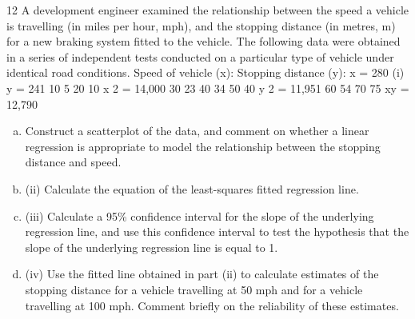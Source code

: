 \documentclass[a4paper,12pt]{article}
\begin{document}
12
A development engineer examined the relationship between the speed a vehicle is
travelling (in miles per hour, mph), and the stopping distance (in metres, m) for a new
braking system fitted to the vehicle. The following data were obtained in a series of
independent tests conducted on a particular type of vehicle under identical road
conditions.
Speed of vehicle (x):
Stopping distance (y):
x = 280
(i)
y = 241
10
5
20
10
x 2 = 14,000
30
23
40
34
50
40
y 2 = 11,951
60
54
70
75
xy = 12,790

\begin{enumerate}[(a)]
\item Construct a scatterplot of the data, and comment on whether a linear
regression is appropriate to model the relationship between the stopping
distance and speed. 
\item (ii) Calculate the equation of the least-squares fitted regression line. 
\item (iii) Calculate a 95\% confidence interval for the slope of the underlying regression
line, and use this confidence interval to test the hypothesis that the slope of the
underlying regression line is equal to 1.
\item 
(iv) Use the fitted line obtained in part (ii) to calculate estimates of the stopping
distance for a vehicle travelling at 50 mph and for a vehicle travelling at 100
mph.
Comment briefly on the reliability of these estimates.
\end{enumerate}
\newpage
\end{document}
